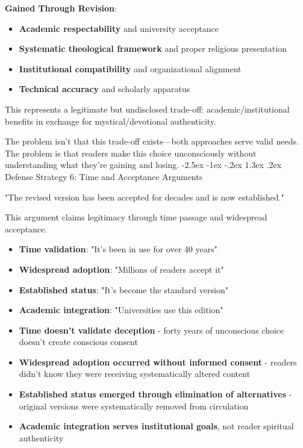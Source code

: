 \documentclass[12pt,twoside]{book}
\makeatletter
\renewcommand\section{\@startsection{section}{1}{\z@}%
{-2.5ex \@plus -1ex \@minus -.2ex}%
{1.3ex \@plus.2ex}%
{\normalfont\Large\bfseries}}
\makeatother
\begin{document}
\textbf{\textbf{Gained Through Revision}}:
\begin{itemize}
\item \textbf{\textbf{Academic respectability}} and university acceptance
\item \textbf{\textbf{Systematic theological framework}} and proper religious presentation
\item \textbf{\textbf{Institutional compatibility}} and organizational alignment
\item \textbf{\textbf{Technical accuracy}} and scholarly apparatus
\end{itemize}

This represents a legitimate but undisclosed trade-off: academic/institutional benefits in exchange for mystical/devotional authenticity.

The problem isn't that this trade-off exists—both approaches serve valid needs. The problem is that readers make this choice unconsciously without understanding what they're gaining and losing.
\section{Defense Strategy 6: Time and Acceptance Arguments}
\label{sec:orgf564849}

"The revised version has been accepted for decades and is now established."

This argument claims legitimacy through time passage and widespread acceptance.

\begin{itemize}
\item \textbf{\textbf{Time validation}}: "It's been in use for over 40 years"
\item \textbf{\textbf{Widespread adoption}}: "Millions of readers accept it"
\item \textbf{\textbf{Established status}}: "It's become the standard version"
\item \textbf{\textbf{Academic integration}}: "Universities use this edition"

\item \textbf{\textbf{Time doesn't validate deception}} - forty years of unconscious choice doesn't create conscious consent
\item \textbf{\textbf{Widespread adoption occurred without informed consent}} - readers didn't know they were receiving systematically altered content
\item \textbf{\textbf{Established status emerged through elimination of alternatives}} - original versions were systematically removed from circulation
\item \textbf{\textbf{Academic integration serves institutional goals}}, not reader spiritual authenticity
\end{itemize}
\end{document}
